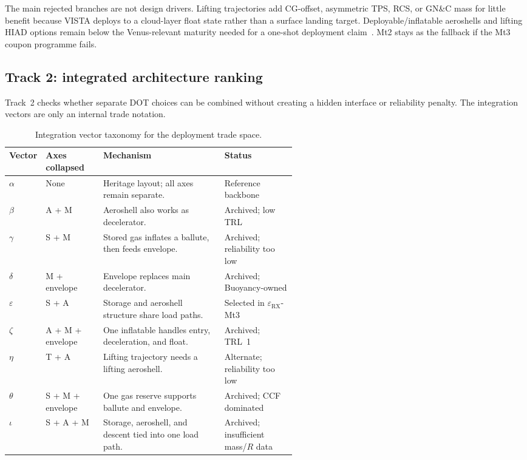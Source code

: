 The main rejected branches are not design drivers. Lifting trajectories add CG-offset, asymmetric TPS, RCS, or GN\&C mass for little benefit because VISTA deploys to a cloud-layer float state rather than a surface landing target. Deployable/inflatable aeroshells and lifting HIAD options remain below the Venus-relevant maturity needed for a one-shot deployment claim~\cite{Mankins1995,Grinspoon2010,Sagdeev1986}. Mt2 stays as the fallback if the Mt3 coupon programme fails.

\subsection{Track 2: integrated architecture ranking}

Track~2 checks whether separate DOT choices can be combined without creating a hidden interface or reliability penalty. The integration vectors are only an internal trade notation.

\begin{table}[H]
    \centering
    \renewcommand{\arraystretch}{1}
    \footnotesize
    \caption{Integration vector taxonomy for the deployment trade space.}
    \label{tab:integration_vectors}
    \begin{tabularx}{\linewidth}{p{0.10\linewidth} p{0.20\linewidth} X p{0.25\linewidth}}
        \toprule
        \textbf{Vector} & \textbf{Axes collapsed} & \textbf{Mechanism} & \textbf{Status} \\
        \midrule
        $\alpha$ & None & Heritage layout; all axes remain separate. & Reference backbone \\
        $\beta$ & A + M & Aeroshell also works as decelerator. & Archived; low TRL \\
        $\gamma$ & S + M & Stored gas inflates a ballute, then feeds envelope. & Archived; reliability too low \\
        $\delta$ & M + envelope & Envelope replaces main decelerator. & Archived; Buoyancy-owned \\
        $\varepsilon$ & S + A & Storage and aeroshell structure share load paths. & Selected in $\varepsilon_{\mathrm{RX}}$-Mt3 \\
        $\zeta$ & A + M + envelope & One inflatable handles entry, deceleration, and float. & Archived; TRL~1 \\
        $\eta$ & T + A & Lifting trajectory needs a lifting aeroshell. & Alternate; reliability too low \\
        $\theta$ & S + M + envelope & One gas reserve supports ballute and envelope. & Archived; CCF dominated \\
        $\iota$ & S + A + M & Storage, aeroshell, and descent tied into one load path. & Archived; insufficient mass/$R$ data \\
        \bottomrule
    \end{tabularx}
\end{table}

